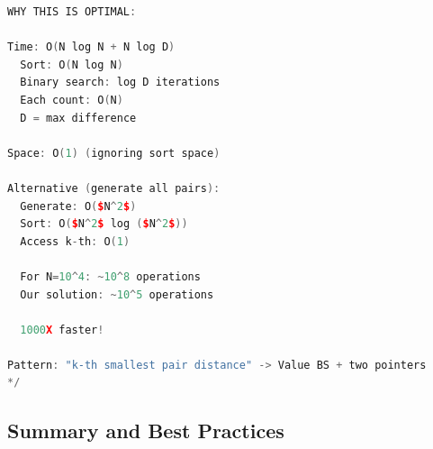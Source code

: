 \documentclass[11pt,a4paper,oneside]{book}
\begin{document}
\begin{lstlisting}[language=C++, caption=Complete Pair Distance Solutions]
WHY THIS IS OPTIMAL:

Time: O(N log N + N log D)
  Sort: O(N log N)
  Binary search: log D iterations
  Each count: O(N)
  D = max difference

Space: O(1) (ignoring sort space)

Alternative (generate all pairs):
  Generate: O($N^2$)
  Sort: O($N^2$ log ($N^2$))
  Access k-th: O(1)
  
  For N=10^4: ~10^8 operations
  Our solution: ~10^5 operations
  
  1000X faster!

Pattern: "k-th smallest pair distance" -> Value BS + two pointers
*/
\end{lstlisting}

\subsection{Summary and Best Practices}
\end{document}

